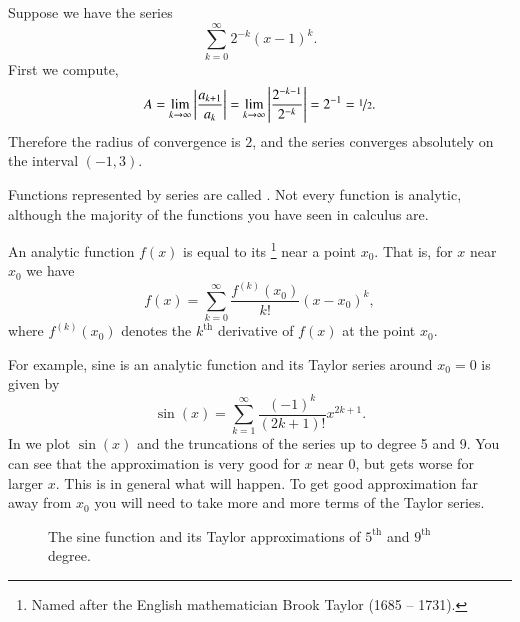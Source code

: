 \documentclass[12pt]{book}
\begin{document}
\begin{example}
Suppose we have the series
\begin{equation*}
\sum_{k=0}^\infty 2^{-k} {(x-1)}^k .
\end{equation*}
First we compute,
\begin{equation*}
A = \lim_{k\to\infty} 
\left \lvert
\frac{a_{k+1}}{a_k}
\right \rvert
=
\lim_{k\to\infty} 
\left \lvert
\frac{2^{-k-1}}{2^{-k}}
\right \rvert
=
2^{-1} = \nicefrac{1}{2}.
\end{equation*}
Therefore the radius of convergence is $2$, and the series
converges absolutely on the interval $(-1,3)$.
\end{example}

Functions represented by series are called
\emph{}.  Not every function is analytic,
although the majority of the functions you have seen in calculus are.

An analytic function $f(x)$ is equal to its \emph{}%
\footnote{Named after the English mathematician Brook Taylor
(1685 -- 1731).}
near a point $x_0$.
That is, for $x$ near $x_0$ we have
\begin{equation*}
f(x) = \sum_{k=0}^\infty \frac{f^{(k)}(x_0)}{k!} {(x-x_0)}^k ,
\end{equation*}
where $f^{(k)}(x_0)$ denotes the $k^{\text{th}}$ derivative of $f(x)$
at the point $x_0$.

For example, sine is an analytic function and its Taylor series
around $x_0 = 0$
is given by
\begin{equation*}
\sin(x) = \sum_{k=1}^\infty \frac{(-1)^k}{(2k+1)!}
 x^{2k+1} .
\end{equation*}
In  we plot $\sin(x)$ and the truncations of the
series up to degree 5 and 9.  You can see that the approximation is very
good for $x$ near 0, but gets worse for larger $x$.  This is in general
what will happen.  To get good approximation far away from $x_0$ you
will need to take more and more terms of the Taylor series.
\begin{figure}[h!t]
\capstart
\begin{center}
\caption{The sine function and its Taylor approximations
of $5^{\text{th}}$ and $9^{\text{th}}$ degree.\label{ps:sin}}
\end{center}
\end{figure}

\medskip
\end{document}

